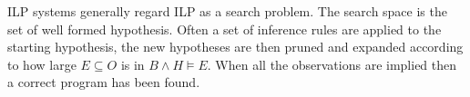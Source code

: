 ILP systems generally regard ILP as a search problem. The search space is the set of well formed hypothesis. Often a set of inference rules are applied to the starting hypothesis, the new hypotheses are then pruned and expanded according to how large $E\subseteq O$ is in $B \wedge H \vDash E$. When all the observations are implied then a correct program has been found.

%
%


